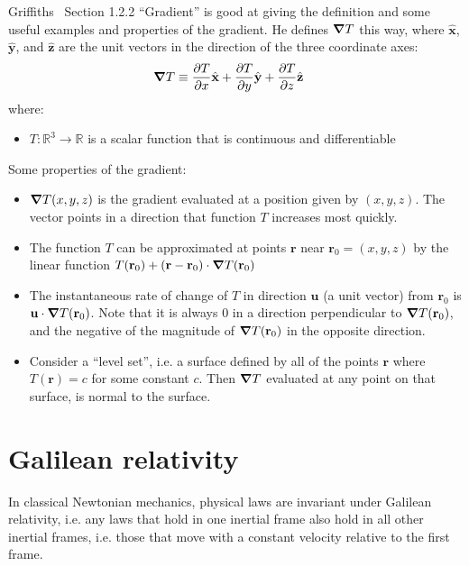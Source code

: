 \documentclass[a4paper]{article}
\theoremstyle{plain}
\theoremstyle{definition}
\newcommand{\vect}[1]{\textbf{#1}}
\newcommand{\hatvec}[1]{\hat{\textbf{#1}}}
\newcommand{\reals}{\mathbb{R}}
\begin{document}
Griffiths~\cite{Griffiths1998} Section 1.2.2 ``Gradient'' is good at
giving the definition and some useful examples and properties of the
gradient.  He defines $\grad T$ this way, where $\hatvec{x}$,
$\hatvec{y}$, and $\hatvec{z}$ are the unit vectors in the direction
of the three coordinate axes:
\begin{align*}
  \grad T & \equiv \frac{\partial T}{\partial x} \hatvec{x}
                 + \frac{\partial T}{\partial y} \hatvec{y}
                 + \frac{\partial T}{\partial z} \hatvec{z}
\end{align*}
where:
\begin{itemize}
  \item $T : \reals^3 \rightarrow \reals$ is a scalar function that is
    continuous and differentiable
\end{itemize}
Some properties of the gradient:
\begin{itemize}
  \item $\grad T(x, y, z)$ is the gradient evaluated at a position
    given by $(x, y, z)$.  The vector points in a direction that
    function $T$ increases most quickly.
  \item The function $T$ can be approximated at points $\vect{r}$ near
    $\vect{r}_0 = (x, y, z)$ by the linear function $T(\vect{r}_0) +
    (\vect{r} - \vect{r}_0) \cdot \grad T(\vect{r}_0)$
  \item The instantaneous rate of change of $T$ in direction
    $\vect{u}$ (a unit vector) from $\vect{r}_0$ is $\vect{u} \cdot
    \grad T(\vect{r}_0)$.  Note that it is always 0 in a direction
    perpendicular to $\grad T(\vect{r}_0)$, and the negative of the
    magnitude of $\grad T(\vect{r}_0)$ in the opposite direction.
  \item Consider a ``level set'', i.e. a surface defined by all of the
    points $\vect{r}$ where $T(\vect{r})=c$ for some constant $c$.
    Then $\grad T$ evaluated at any point on that surface, is normal
    to the surface.
\end{itemize}


\section{Galilean relativity}

In classical Newtonian mechanics, physical laws are invariant under
Galilean relativity, i.e. any laws that hold in one inertial frame
also hold in all other inertial frames, i.e. those that move with a
constant velocity relative to the first frame.
\end{document}
